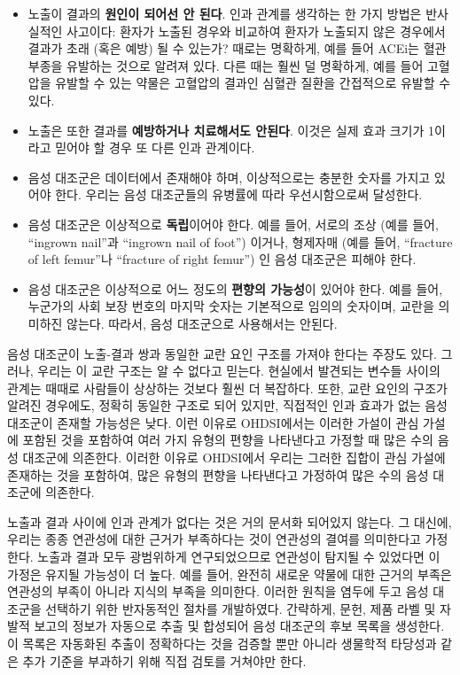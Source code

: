 \documentclass[11pt]{book}
\providecommand{\tightlist}{%
  \setlength{\itemsep}{0pt}\setlength{\parskip}{0pt}}
\theoremstyle{definition}
\theoremstyle{definition}
\theoremstyle{definition}
\theoremstyle{remark}
\begin{document}
\begin{itemize}
\tightlist
\item
  노출이 결과의 \textbf{원인이 되어선 안 된다}. 인과 관계를 생각하는 한
  가지 방법은 반사실적인 사고이다: 환자가 노출된 경우와 비교하여 환자가
  노출되지 않은 경우에서 결과가 초래 (혹은 예방) 될 수 있는가? 때로는
  명확하게, 예를 들어 ACEi는 혈관 부종을 유발하는 것으로 알려져 있다.
  다른 때는 훨씬 덜 명확하게, 예를 들어 고혈압을 유발할 수 있는 약물은
  고혈압의 결과인 심혈관 질환을 간접적으로 유발할 수 있다.
\item
  노출은 또한 결과를 \textbf{예방하거나 치료해서도 안된다}. 이것은 실제
  효과 크기가 1이라고 믿어야 할 경우 또 다른 인과 관계이다.
\item
  음성 대조군은 데이터에서 존재해야 하며, 이상적으로는 충분한 숫자를
  가지고 있어야 한다. 우리는 음성 대조군들의 유병률에 따라
  우선시함으로써 달성한다.
\item
  음성 대조군은 이상적으로 \textbf{독립}이어야 한다. 예를 들어, 서로의
  조상 (예를 들어, ``ingrown nail''과 ``ingrown nail of foot'') 이거나,
  형제자매 (예를 들어, ``fracture of left femur''나 ``fracture of right
  femur'') 인 음성 대조군은 피해야 한다.
\item
  음성 대조군은 이상적으로 어느 정도의 \textbf{편향의 가능성}이 있어야
  한다. 예를 들어, 누군가의 사회 보장 번호의 마지막 숫자는 기본적으로
  임의의 숫자이며, 교란을 의미하진 않는다. 따라서, 음성 대조군으로
  사용해서는 안된다.
\end{itemize}

음성 대조군이 노출-결과 쌍과 동일한 교란 요인 구조를 가져야 한다는
주장도 있다. \citep{lipsitch_2010} 그러나, 우리는 이 교란 구조는 알 수
없다고 믿는다. 현실에서 발견되는 변수들 사이의 관계는 때때로 사람들이
상상하는 것보다 훨씬 더 복잡하다. 또한, 교란 요인의 구조가 알려진
경우에도, 정확히 동일한 구조로 되어 있지만, 직접적인 인과 효과가 없는
음성 대조군이 존재할 가능성은 낮다. 이런 이유로 OHDSI에서는 이러한
가설이 관심 가설에 포함된 것을 포함하여 여러 가지 유형의 편향을
나타낸다고 가정할 때 많은 수의 음성 대조군에 의존한다. 이러한 이유로
OHDSI에서 우리는 그러한 집합이 관심 가설에 존재하는 것을 포함하여, 많은
유형의 편향을 나타낸다고 가정하여 많은 수의 음성 대조군에 의존한다.

노출과 결과 사이에 인과 관계가 없다는 것은 거의 문서화 되어있지 않는다.
그 대신에, 우리는 종종 연관성에 대한 근거가 부족하다는 것이 연관성의
결여를 의미한다고 가정한다. 노출과 결과 모두 광범위하게 연구되었으므로
연관성이 탐지될 수 있었다면 이 가정은 유지될 가능성이 더 높다. 예를
들어, 완전히 새로운 약물에 대한 근거의 부족은 연관성의 부족이 아니라
지식의 부족을 의미한다. 이러한 원칙을 염두에 두고 음성 대조군을 선택하기
위한 반자동적인 절차를 개발하였다. \citep{voss_2016} 간략하게, 문헌,
제품 라벨 및 자발적 보고의 정보가 자동으로 추출 및 합성되어 음성
대조군의 후보 목록을 생성한다. 이 목록은 자동화된 추출이 정확하다는 것을
검증할 뿐만 아니라 생물학적 타당성과 같은 추가 기준을 부과하기 위해 직접
검토를 거쳐야만 한다.
\end{document}
